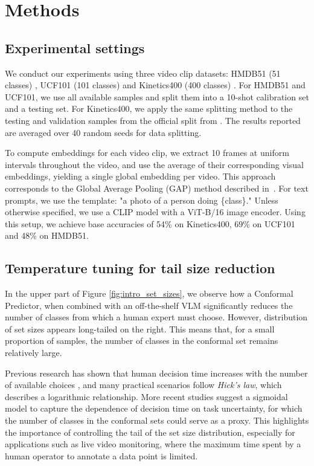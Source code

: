 \section{Methods}

\subsection{Experimental settings}\label{sec:datasets}
We conduct our experiments using three video clip datasets: HMDB51 (51 classes) \cite{hmdb51}, UCF101 (101 classes) \cite{soomro2012ucf101} and Kinetics400 (400 classes) \cite{carreira2017quo}. For HMDB51 and UCF101, we use all available samples and split them into a 10-shot calibration set and a testing set. For Kinetics400, we apply the same splitting method to the testing and validation samples from the official split from \cite{carreira2017quo}. The results reported are averaged over 40 random seeds for data splitting.

To compute embeddings for each video clip, we extract 10 frames at uniform intervals throughout the video, and use the average of their corresponding visual embeddings, yielding a single global embedding per video. This approach corresponds to the Global Average Pooling (GAP) method described in~\cite{wang2021actionclip}. For text prompts, we use the template: "a photo of a person doing \{class\}." Unless otherwise specified, we use a CLIP model with a ViT-B/16 image encoder. Using this setup, we achieve base accuracies of 54\% on Kinetics400, 69\% on UCF101 and 48\% on HMDB51.

\subsection{Temperature tuning for tail size reduction}
In the upper part of Figure \ref{fig:intro_set_sizes}, we observe how a Conformal Predictor, when combined with an off-the-shelf VLM significantly reduces the number of classes from which a human expert must choose. However, distribution of set sizes appears long-tailed on the right. This means that, for a small proportion of samples, the number of classes in the conformal set remains relatively large.

Previous research has shown that human decision time increases with the number of available choices \cite{hick1952rate, landauer1985selection}, and many practical scenarios follow \textit{Hick's law}, which describes a logarithmic relationship. More recent studies suggest a sigmoidal model \cite{pavao2016sequence} to capture the dependence of decision time on task uncertainty, for which the number of classes in the conformal sets could serve as a proxy. This highlights the importance of controlling the tail of the set size distribution, especially for applications such as live video monitoring, where the maximum time spent by a human operator to annotate a data point is limited.

